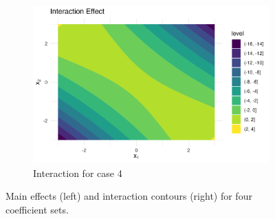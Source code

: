 \begin{figure}[htpb]
\begin{subfigure}[t]{0.49\textwidth}
        \includegraphics[width=\textwidth]{images/full_a1m20_a2p20_a11m10_a22p10_a12m10_rhom05_interaction.png}
        \caption{Interaction for case 4}
    \end{subfigure}
    \caption{Main effects (left) and interaction contours (right) for four coefficient sets.}
    \label{fig:all_pairs}
\end{figure}